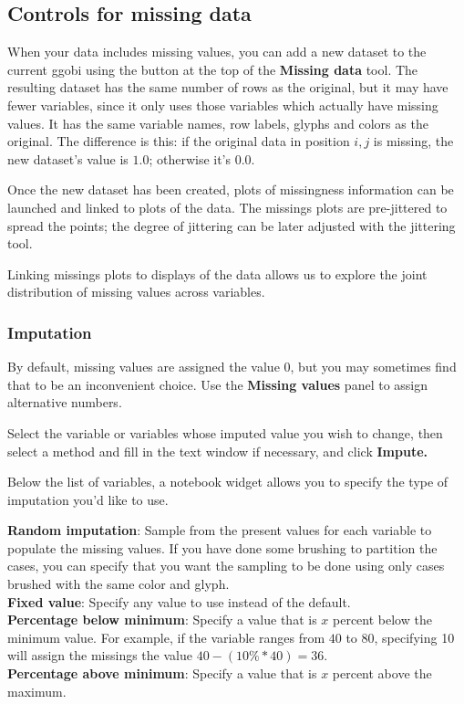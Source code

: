 \documentclass[11pt]{article}
\begin{document}
\subsection{Controls for missing data}

When your data includes missing values, you can add a new dataset to the
current ggobi using the button at the top of the {\bf Missing data} tool.
The resulting dataset has the same number of rows as the original,
but it may have fewer variables, since it only uses those variables
which actually have missing values.  It has the same variable names,
row labels, glyphs and colors as the original.  The difference is this:
if the original data in position $i,j$ is missing, the new dataset's
value is $1.0$; otherwise it's $0.0$.

Once the new dataset has been created, plots of missingness information
can be launched and linked to plots of the data.  The missings plots
are pre-jittered to spread the points; the degree of jittering can
be later adjusted with the jittering tool.

Linking missings plots to displays of the data allows us to explore the
joint distribution of missing values across variables.

\subsubsection{Imputation}

%
By default, missing values are assigned the value $0$, but you
may sometimes find that to be an inconvenient choice.  Use the
{\bf Missing values} panel to assign alternative numbers.

Select the variable or variables whose imputed value you
wish to change, then select a method and fill in the text window
if necessary, and click {\bf Impute.}

Below the list of variables, a notebook widget allows you to specify
the type of imputation you'd like to use.

{\bf Random imputation}: Sample from the present values for each variable
  to populate the missing values.  If you have done some brushing to
  partition the cases, you can specify that you want the sampling to be
  done using only cases brushed with the same color and glyph.
\\{\bf Fixed value}: Specify any value to use instead of the default.
\\{\bf Percentage below minimum}: Specify a value that is $x$ percent
  below the minimum value.  For example, if the variable ranges from
 $40$ to $80$, specifying 10 will assign the missings the value $40 - (10\%
 * 40) = 36$.
\\{\bf Percentage above minimum}: Specify a value that is $x$ percent
above the maximum.
\end{document}

